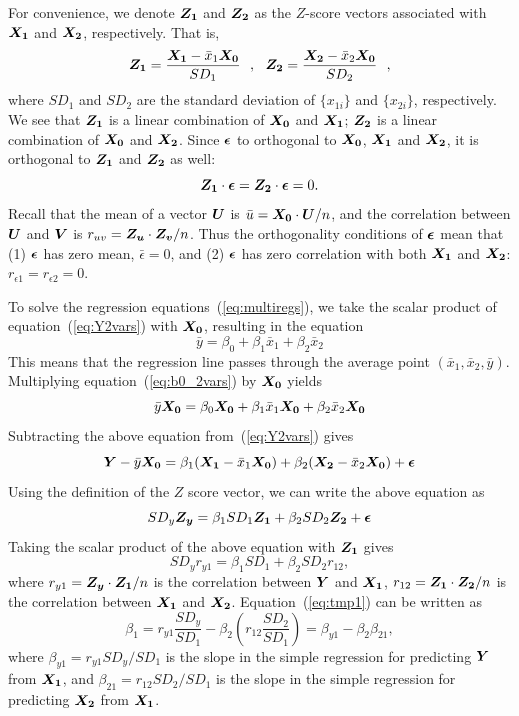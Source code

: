 \documentclass[11pt]{article}
\newcommand{\beq}{\begin{equation}}
\newcommand{\eeq}{\end{equation}}
\newcommand{\ve}[1]{\mbox{\boldmath $#1$}}
\begin{document}
For convenience, we denote $\ve{Z_1}$ and $\ve{Z_2}$ as the $Z$-score vectors associated 
with $\ve{X_1}$ and $\ve{X_2}$, respectively. That is, 
\beq
  \ve{Z_1} = \frac{\ve{X_1}-\bar{x}_1 \ve{X_0}}{SD_1} \ \ , \ \ 
  \ve{Z_2} = \frac{\ve{X_2}-\bar{x}_2 \ve{X_0}}{SD_2} \ \ ,
\eeq
where $SD_1$ and $SD_2$ are the standard deviation of $\{ x_{1i}\}$ and $\{ x_{2i}\}$, 
respectively. We see that $\ve{Z_1}$ is a linear combination of $\ve{X_0}$ and $\ve{X_1}$; 
$\ve{Z_2}$ is a linear combination of $\ve{X_0}$ and $\ve{X_2}$. Since $\ve{\epsilon}$ 
to orthogonal to $\ve{X_0}$, $\ve{X_1}$ and $\ve{X_2}$, it is orthogonal to $\ve{Z_1}$ 
and $\ve{Z_2}$ as well: 
\beq
  \ve{Z_1}\cdot \ve{\epsilon} = \ve{Z_2} \cdot \ve{\epsilon} = 0 .
\eeq
Recall that the mean of a vector $\ve{U}$ is $\bar{u}=\ve{X_0}\cdot \ve{U}/n$, 
and the correlation between $\ve{U}$ and $\ve{V}$ is $r_{uv}= \ve{Z_u}\cdot \ve{Z_v}/n$. 
Thus the orthogonality conditions of $\ve{\epsilon}$ mean that 
(1) $\ve{\epsilon}$ has zero mean, $\bar{\epsilon}=0$, and (2) $\ve{\epsilon}$  
has zero correlation
with both $\ve{X_1}$ and $\ve{X_2}$: $r_{\epsilon 1}=r_{\epsilon 2}=0$.

To solve the regression equations~(\ref{eq:multiregs}), we take the scalar product 
of equation~(\ref{eq:Y2vars}) with $\ve{X_0}$, resulting in the equation 
\beq
  \bar{y} = \beta_0 + \beta_1 \bar{x}_1 + \beta_2 \bar{x}_2 
\label{eq:b0_2vars}
\eeq
This means that the regression line passes through the average point $(\bar{x}_1,\bar{x}_2,\bar{y})$. 
Multiplying equation~(\ref{eq:b0_2vars}) by $\ve{X_0}$ yields 
\[
  \bar{y} \ve{X_0} = \beta_0 \ve{X_0} + \beta_1 \bar{x}_1 \ve{X_0} + \beta_2 \bar{x}_2 \ve{X_0}
\]
Subtracting the above equation from~(\ref{eq:Y2vars}) gives 
\[
  \ve{Y} - \bar{y} \ve{X_0} = \beta_1 (\ve{X_1}-\bar{x}_1\ve{X_0}) + \beta_2 (\ve{X_2}-\bar{x}_2\ve{X_0}) 
+ \ve{\epsilon}
\]
Using the definition of the $Z$ score vector, we can write the above equation as 
\beq
  SD_y \ve{Z_y} = \beta_1 SD_1 \ve{Z_1} + \beta_2 SD_2 \ve{Z_2} + \ve{\epsilon}
\label{eq:ZyZ1Z2}
\eeq
Taking the scalar product of the above equation with $\ve{Z_1}$ gives 
\beq
  SD_y r_{y1} = \beta_1 SD_1 + \beta_2 SD_2 r_{12} ,
\label{eq:tmp1}
\eeq
where $r_{y1}=\ve{Z_y}\cdot \ve{Z_1}/n$ is the correlation between $\ve{Y}$ and 
$\ve{X_1}$, $r_{12}=\ve{Z_1}\cdot \ve{Z_2}/n$ is the correlation between 
$\ve{X_1}$ and $\ve{X_2}$. Equation~(\ref{eq:tmp1}) can be written as 
\beq
  \beta_1 = r_{y1} \frac{SD_y}{SD_1} - \beta_2 \left( r_{12} \frac{SD_2}{SD_1}\right) 
= \beta_{y1} - \beta_2 \beta_{21} , 
\label{eq:beta1}
\eeq
where 
$\beta_{y1}= r_{y1} SD_y/SD_1$ is the slope in the simple regression for predicting $\ve{Y}$ 
from $\ve{X_1}$, and $\beta_{21}=r_{12} SD_2/SD_1$ is the slope in the simple regression 
for predicting $\ve{X_2}$ from $\ve{X_1}$. 
\end{document}
